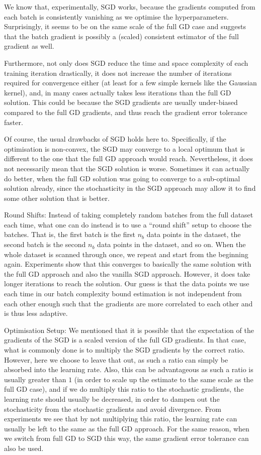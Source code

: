 \documentclass{article}
\begin{document}
		We know that, experimentally, SGD works, because the gradients computed from each batch is consistently vanishing as we optimise the hyperparameters. Surprisingly, it seems to be on the same scale of the full GD case and suggests that the batch gradient is possibly a (scaled) consistent estimator of the full gradient as well.
		
		Furthermore, not only does SGD reduce the time and space complexity of each training iteration drastically, it does not increase the number of iterations required for convergence either (at least for a few simple kernels like the Gaussian kernel), and, in many cases actually takes less iterations than the full GD solution. This could be because the SGD gradients are usually under-biased compared to the full GD gradients, and thus reach the gradient error tolerance faster.
		
		Of course, the usual drawbacks of SGD holds here to. Specifically, if the optimisation is non-convex, the SGD may converge to a local optimum that is different to the one that the full GD approach would reach. Nevertheless, it does not necessarily mean that the SGD solution is worse. Sometimes it can actually do better, when the full GD solution was going to converge to a sub-optimal solution already, since the stochasticity in the SGD approach may allow it to find some other solution that is better.
		
		Round Shifts: Instead of taking completely random batches from the full dataset each time, what one can do instead is to use a ``round shift'' setup to choose the batches. That is, the first batch is the first $n_{b}$ data points in the dataset, the second batch is the second $n_{b}$ data points in the dataset, and so on. When the whole dataset is scanned through once, we repeat and start from the beginning again. Experiments show that this converges to basically the same solution with the full GD approach and also the vanilla SGD approach. However, it does take longer iterations to reach the solution. Our guess is that the data points we use each time in our batch complexity bound estimation is not independent from each other enough such that the gradients are more correlated to each other and is thus less adaptive.
		
		Optimisation Setup: We mentioned that it is possible that the expectation of the gradients of the SGD is a scaled version of the full GD gradients. In that case, what is commonly done is to multiply the SGD gradients by the correct ratio. However, here we choose to leave that out, as such a ratio can simply be absorbed into the learning rate. Also, this can be advantageous as such a ratio is usually greater than $1$ (in order to scale up the estimate to the same scale as the full GD case), and if we do multiply this ratio to the stochastic gradients, the learning rate should usually be decreased, in order to dampen out the stochasticity from the stochastic gradients and avoid divergence. From experiments we see that by not multiplying this ratio, the learning rate can usually be left to the same as the full GD approach. For the same reason, when we switch from full GD to SGD this way, the same gradient error tolerance can also be used.
			
\end{document}
